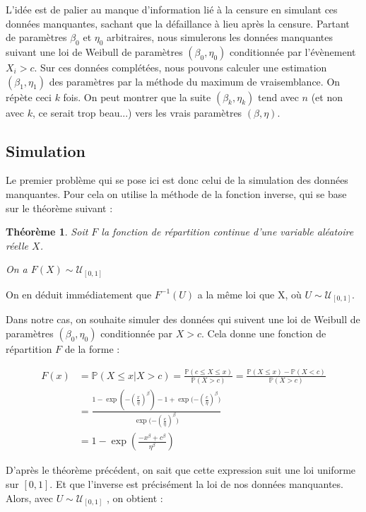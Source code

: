 \documentclass[a4paper]{report}
\newtheorem{theorem}{Théorème}
\begin{document}
  L'idée est de palier au manque d'information lié à la censure en simulant ces données manquantes, sachant que la défaillance à lieu après la censure. Partant de paramètres $\beta_0$ et $\eta_0$ arbitraires, nous simulerons les données manquantes suivant une loi de Weibull de paramètres $(\beta_0,\eta_0)$ conditionnée par l'évènement ${X_i >c}$. Sur ces données complétées, nous pouvons calculer une estimation $(\beta_1,\eta_1)$ des paramètres par la méthode du maximum de vraisemblance. On répète ceci $k$ fois. On peut montrer que la suite $(\beta_k, \eta_k)$ tend avec $n$ (et non avec $k$, ce serait trop beau...) vers les vrais paramètres $(\beta,\eta)$.
  
  \subsection{Simulation}
  
  Le premier problème qui se pose ici est donc celui de la simulation des données manquantes. Pour cela on utilise la méthode de la fonction inverse, qui se base sur le théorème suivant : 
  
 \begin{theorem}
Soit $F$ la fonction de répartition continue d'une variable aléatoire réelle $X$. 

On a $F(X) \sim \mathcal{U}_{[0,1]}$
\end{theorem}
  
 On en déduit immédiatement que $F^{-1}(U)$ a la même loi que X, où $U\sim\mathcal{U}_{[0,1]}$. 
 
Dans notre cas, on souhaite simuler des données qui suivent une loi de Weibull de paramètres $(\beta_0,\eta_0)$ conditionnée par ${X>c}$. Cela donne une fonction de répartition $F$ de la forme :
 
 \begin{align*}
 F(x) & =  \mathbb{P}(X \leq x | X > c) = \frac{\mathbb{P}(c \leq X \leq x)}{\mathbb{P}(X>c)} 
= \frac{\mathbb{P} (X \leq x) - \mathbb{P}(X<c)}{\mathbb{P}(X>c)} \\
&= \frac{1-\exp{(-(\frac{x}{\eta})^{\beta})} - 1 + \exp{(-(\frac{c}{\eta})^{\beta}})}{\exp{(-(\frac{c}{\eta})^{\beta}})} \\
&= 1 - \exp{\left( \frac{-x^{\beta}+c^{\beta}}{\eta^{\beta}} \right)}
\end{align*}

D'après le théorème précédent, on sait que cette expression suit une loi uniforme sur $[0,1]$.
Et que l'inverse est précisément la loi de nos données manquantes. 
Alors, avec $U \sim \mathcal{U}_{[0,1]} $ , on obtient : 
\end{document}

